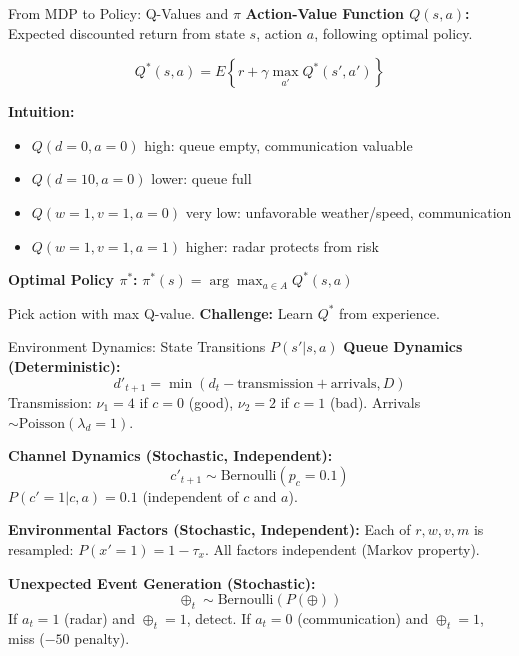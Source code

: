 \documentclass{beamer}
\begin{document}
\begin{frame}{From MDP to Policy: Q-Values and $\pi$}
  \footnotesize
  \textbf{Action-Value Function $Q(s, a)$:} Expected discounted return from state $s$, action $a$, following optimal policy.

  \vspace{0.08cm}
  $$Q^*(s, a) = E\left\{ r + \gamma \max_{a'} Q^*(s', a') \right\}$$

  \vspace{0.08cm}
  \textbf{Intuition:}
  \begin{itemize}
    \setlength{\itemsep}{0.03cm}
    \item $Q(d=0, a=0)$ high: queue empty, communication valuable
    \item $Q(d=10, a=0)$ lower: queue full
    \item $Q(w=1, v=1, a=0)$ very low: unfavorable weather/speed, communication
    \item $Q(w=1, v=1, a=1)$ higher: radar protects from risk
  \end{itemize}

  \vspace{0.08cm}
  \textbf{Optimal Policy $\pi^*$:} $\pi^*(s) = \arg\max_{a \in A} Q^*(s, a)$

  \scriptsize Pick action with max Q-value. \textbf{Challenge:} Learn $Q^*$ from experience.

  \normalsize
\end{frame}

\begin{frame}{Environment Dynamics: State Transitions $P(s'|s,a)$}
  \footnotesize
  \textbf{Queue Dynamics (Deterministic):}
  $$d'_{t+1} = \min\left( d_t - \text{transmission} + \text{arrivals}, D \right)$$
  Transmission: $\nu_1=4$ if $c=0$ (good), $\nu_2=2$ if $c=1$ (bad). Arrivals $\sim \text{Poisson}(\lambda_d=1)$.

  \vspace{0.08cm}
  \textbf{Channel Dynamics (Stochastic, Independent):}
  $$c'_{t+1} \sim \text{Bernoulli}(p_c=0.1)$$
  $P(c'=1 | c, a) = 0.1$ (independent of $c$ and $a$).

  \vspace{0.08cm}
  \textbf{Environmental Factors (Stochastic, Independent):}
  Each of $r, w, v, m$ is resampled: $P(x'=1) = 1 - \tau_x$. All factors independent (Markov property).

  \vspace{0.08cm}
  \textbf{Unexpected Event Generation (Stochastic):}
  $$\oplus_t \sim \text{Bernoulli}(P(\oplus))$$
  \scriptsize If $a_t=1$ (radar) and $\oplus_t=1$, detect. If $a_t=0$ (communication) and $\oplus_t=1$, miss ($-50$ penalty).

  \normalsize
\end{frame}
\end{document}
